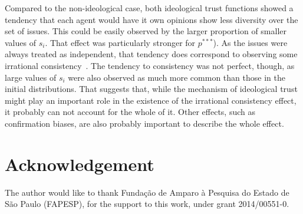\documentclass{article}
\begin{document}
	Compared to the non-ideological case, both ideological trust functions showed a tendency that each agent would have it own opinions show less diversity over the set of issues. This could be easily observed by the larger proportion of smaller values of $s_i$. That effect was particularly stronger for  \( p^{***}\)). As the issues were always treated as independent, that tendency does correspond to observing some irrational consistency~\cite{jervis76a}. The tendency to consistency was not perfect, though, as large values of $s_i$ were also observed as much more common than those in the initial distributions. That suggests that, while the mechanism of ideological trust might play an important role in the existence of the irrational consistency effect, it probably can not account for the whole of it. Other effects, such as confirmation biases, are also probably important to describe the whole effect.

 
\section{Acknowledgement}
The author would like to thank Funda\c{c}\~ao de Amparo \`a Pesquisa do Estado de S\~ao Paulo (FAPESP), for the support to this work, under grant 2014/00551-0.


%

\end{document}

